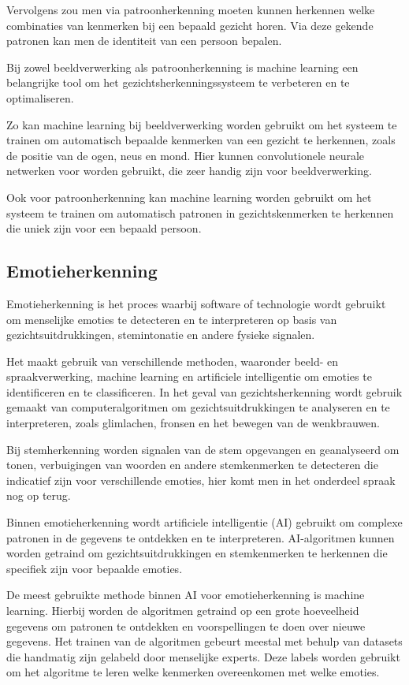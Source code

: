 Vervolgens zou men via patroonherkenning moeten kunnen herkennen welke combinaties van kenmerken bij een bepaald gezicht horen. Via deze gekende patronen kan men de identiteit van een persoon bepalen.

Bij zowel beeldverwerking als patroonherkenning is machine learning een belangrijke tool om het gezichtsherkenningssysteem te verbeteren en te optimaliseren.

Zo kan machine learning bij beeldverwerking worden gebruikt om het systeem te trainen om automatisch bepaalde kenmerken van een gezicht te herkennen, zoals de positie van de ogen, neus en mond. Hier kunnen convolutionele neurale netwerken voor worden gebruikt, die zeer handig zijn voor beeldverwerking.

Ook voor patroonherkenning kan machine learning worden gebruikt om het systeem te trainen om automatisch patronen in gezichtskenmerken te herkennen die uniek zijn voor een bepaald persoon.

\subsection{Emotieherkenning}

Emotieherkenning is het proces waarbij software of technologie wordt gebruikt om menselijke emoties te detecteren en te interpreteren op basis van gezichtsuitdrukkingen, stemintonatie en andere fysieke signalen.

Het maakt gebruik van verschillende methoden, waaronder beeld- en spraakverwerking, machine learning en artificiele intelligentie om emoties te identificeren en te classificeren. In het geval van gezichtsherkenning wordt gebruik gemaakt van computeralgoritmen om gezichtsuitdrukkingen te analyseren en te interpreteren, zoals glimlachen, fronsen en het bewegen van de wenkbrauwen.
 
Bij stemherkenning worden signalen van de stem opgevangen en geanalyseerd om tonen, verbuigingen van woorden en andere stemkenmerken te detecteren die indicatief zijn voor verschillende emoties, hier komt men in het onderdeel spraak nog op terug.

Binnen emotieherkenning wordt artificiele intelligentie (AI) gebruikt om complexe patronen in de gegevens te ontdekken en te interpreteren. AI-algoritmen kunnen worden getraind om gezichtsuitdrukkingen en stemkenmerken te herkennen die specifiek zijn voor bepaalde emoties.

De meest gebruikte methode binnen AI voor emotieherkenning is machine learning. Hierbij worden de algoritmen getraind op een grote hoeveelheid gegevens om patronen te ontdekken en voorspellingen te doen over nieuwe gegevens. Het trainen van de algoritmen gebeurt meestal met behulp van datasets die handmatig zijn gelabeld door menselijke experts. Deze labels worden gebruikt om het algoritme te leren welke kenmerken overeenkomen met welke emoties.

